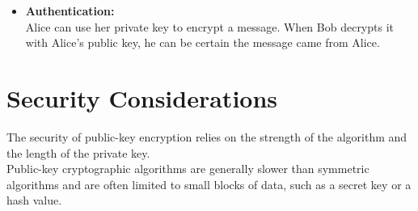 \begin{itemize}
    \item \textbf{Authentication:} 
    \\
    Alice can use her private key to encrypt a message. When Bob decrypts it with Alice’s public key, he can be certain the message came from Alice.
\end{itemize}

\section{Security Considerations}
The security of public-key encryption relies on the strength of the algorithm and the length of the private key. 
\\
Public-key cryptographic algorithms are generally slower than symmetric algorithms and are often limited to small blocks of data, such as a secret key or a hash value.

